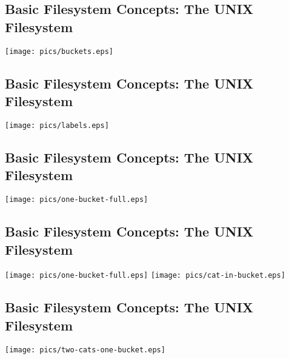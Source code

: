 \documentclass[xga]{xdvislides}
\begin{document}
\subsection{Basic Filesystem Concepts: The UNIX Filesystem}
\vspace*{\fill}
\begin{center}
\texttt{[image: pics/buckets.eps]} \\
\end{center}
\vspace*{\fill}

\subsection{Basic Filesystem Concepts: The UNIX Filesystem}
\vspace*{\fill}
\begin{center}
\texttt{[image: pics/labels.eps]} \\
\end{center}
\vspace*{\fill}

\subsection{Basic Filesystem Concepts: The UNIX Filesystem}
\begin{center}
\texttt{[image: pics/one-bucket-full.eps]} \\
\end{center}

\subsection{Basic Filesystem Concepts: The UNIX Filesystem}
\vspace*{\fill}
\begin{center}
\texttt{[image: pics/one-bucket-full.eps]}
\hspace*{5mm}
\texttt{[image: pics/cat-in-bucket.eps]}
\end{center}
\vspace*{\fill}

\subsection{Basic Filesystem Concepts: The UNIX Filesystem}
\vspace*{\fill}
\begin{center}
\texttt{[image: pics/two-cats-one-bucket.eps]} \\
\end{center}
\vspace*{\fill}
\end{document}
